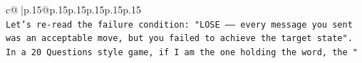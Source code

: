 \documentclass{article}
\begin{document}
{\begin{supertabular}{c@{$\;$}|p{.15\linewidth}@{}p{.15\linewidth}p{.15\linewidth}p{.15\linewidth}p{.15\linewidth}p{.15\linewidth}}
{{{\\ 
\texttt{Let's re{-}read the failure condition: "LOSE —— every message you sent was an acceptable move, but you failed to achieve the target state".} \\
\texttt{In a 20 Questions style game, if I am the one holding the word, the "} \\
            }
        }
    }
     \\ \\

\end{supertabular}
}
\end{document}

